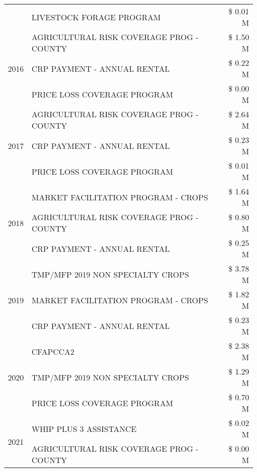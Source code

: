 \begin{tabular}{llr}
 & LIVESTOCK FORAGE PROGRAM & \$ 0.01 M \\
\cline{1-3}
\multirow[t]{3}{*}{2016} & AGRICULTURAL RISK COVERAGE PROG - COUNTY      & \$ 1.50 M \\
 & CRP PAYMENT - ANNUAL RENTAL                   & \$ 0.22 M \\
 & PRICE LOSS COVERAGE PROGRAM                   & \$ 0.00 M \\
\cline{1-3}
\multirow[t]{3}{*}{2017} & AGRICULTURAL RISK COVERAGE PROG - COUNTY & \$ 2.64 M \\
 & CRP PAYMENT - ANNUAL RENTAL & \$ 0.23 M \\
 & PRICE LOSS COVERAGE PROGRAM & \$ 0.01 M \\
\cline{1-3}
\multirow[t]{3}{*}{2018} & MARKET FACILITATION PROGRAM - CROPS & \$ 1.64 M \\
 & AGRICULTURAL RISK COVERAGE PROG - COUNTY & \$ 0.80 M \\
 & CRP PAYMENT - ANNUAL RENTAL & \$ 0.25 M \\
\cline{1-3}
\multirow[t]{3}{*}{2019} & TMP/MFP 2019 NON SPECIALTY CROPS & \$ 3.78 M \\
 & MARKET FACILITATION PROGRAM - CROPS & \$ 1.82 M \\
 & CRP PAYMENT - ANNUAL RENTAL & \$ 0.23 M \\
\cline{1-3}
\multirow[t]{3}{*}{2020} & CFAPCCA2 & \$ 2.38 M \\
 & TMP/MFP 2019 NON SPECIALTY CROPS & \$ 1.29 M \\
 & PRICE LOSS COVERAGE PROGRAM & \$ 0.70 M \\
\cline{1-3}
\multirow[t]{2}{*}{2021} & WHIP PLUS 3 ASSISTANCE & \$ 0.02 M \\
 & AGRICULTURAL RISK COVERAGE PROG - COUNTY & \$ 0.00 M \\
\cline{1-3}
\bottomrule
\end{tabular}
